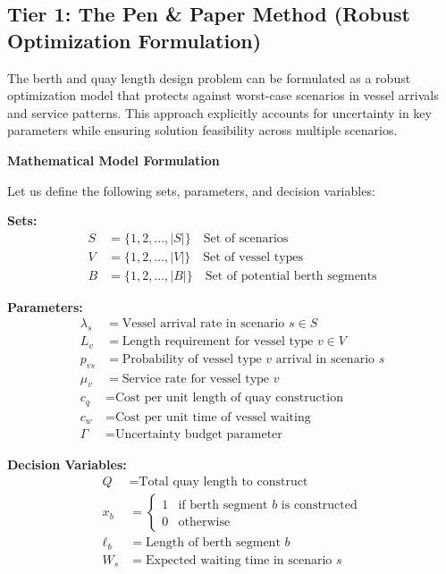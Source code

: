 \documentclass{article}
\begin{document}
\subsection{Tier 1: The Pen \& Paper Method (Robust Optimization Formulation)}

The berth and quay length design problem can be formulated as a robust optimization model that protects against worst-case scenarios in vessel arrivals and service patterns. This approach explicitly accounts for uncertainty in key parameters while ensuring solution feasibility across multiple scenarios.

\textbf{Mathematical Model Formulation}

Let us define the following sets, parameters, and decision variables:

\textbf{Sets:}
\begin{align}
S &= \{1, 2, \ldots, |S|\} \quad \text{Set of scenarios}\\
V &= \{1, 2, \ldots, |V|\} \quad \text{Set of vessel types}\\
B &= \{1, 2, \ldots, |B|\} \quad \text{Set of potential berth segments}
\end{align}

\textbf{Parameters:}
\begin{align}
\lambda_s &= \text{Vessel arrival rate in scenario } s \in S\\
L_v &= \text{Length requirement for vessel type } v \in V\\
p_{vs} &= \text{Probability of vessel type } v \text{ arrival in scenario } s\\
\mu_v &= \text{Service rate for vessel type } v\\
c_q &= \text{Cost per unit length of quay construction}\\
c_w &= \text{Cost per unit time of vessel waiting}\\
\Gamma &= \text{Uncertainty budget parameter}
\end{align}

\textbf{Decision Variables:}
\begin{align}
Q &= \text{Total quay length to construct}\\
x_b &= \begin{cases} 1 & \text{if berth segment } b \text{ is constructed} \\ 0 & \text{otherwise} \end{cases}\\
\ell_b &= \text{Length of berth segment } b\\
W_s &= \text{Expected waiting time in scenario } s
\end{align}
\end{document}
